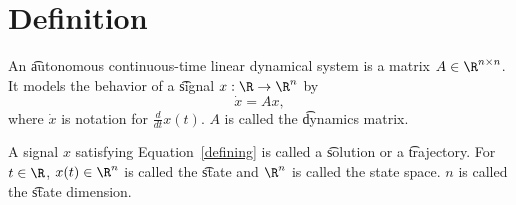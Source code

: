 
\section*{Definition}

An \t{autonomous continuous-time linear dynamical system} is a matrix $A \in \R ^{n \times  n}$.
It models the behavior of a \t{signal} $x: \R  \to \R ^n$ by
\begin{equation}
    \label{defining}\dot{x} = Ax,\end{equation}
where $\dot{x}$ is notation for $\frac{d}{dt} x(t)$.
$A$ is called the \t{dynamics matrix}.

A signal $x$ satisfying Equation~\eqref{defining} is called a \t{solution} or a \t{trajectory}.
For $t \in \R $, $x(t) \in \R ^n$ is called the \t{state} and $\R ^n$ is called the state space.
$n$ is called the \t{state dimension}.

\blankpage